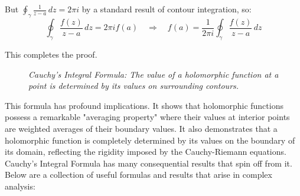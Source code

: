 \noindent But \( \oint_\gamma \frac{1}{z - a} \, dz = 2\pi i \) by a standard result of contour integration, so:
\[
\oint_\gamma \frac{f(z)}{z - a} \, dz = 2\pi i f(a)
\quad \Rightarrow \quad 
f(a) = \frac{1}{2\pi i} \oint_\gamma \frac{f(z)}{z - a} \, dz
\]

\noindent This completes the proof.


\begin{figure}[H]
\centering
{}
\caption{\textit{Cauchy's Integral Formula: The value of a holomorphic function at a point is determined by its values on surrounding contours.}}
\label{fig:cauchy-integral-formula}
\end{figure}

\noindent This formula has profound implications. It shows that holomorphic functions possess a remarkable "averaging property" where their values at interior points are weighted averages of their boundary values. It also demonstrates that a holomorphic function is completely determined by its values on the boundary of its domain, reflecting the rigidity imposed by the Cauchy-Riemann equations. \\



\noindent Cauchy's Integral Formula has many consequential results that spin off from it. Below are a collection of useful formulas and results that arise in complex analysis:

